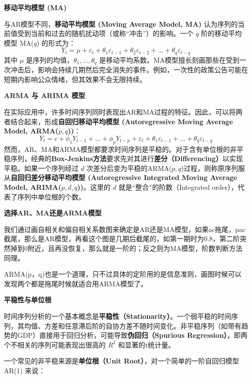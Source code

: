 \textbf{移动平均模型 (MA)}

与AR模型不同，\textbf{移动平均模型 (Moving Average Model, MA)} 认为序列的当前值受到当前和过去的随机扰动项（或称“冲击”）的影响。一个 $q$ 阶的移动平均模型 MA($q$) 的形式为：
\begin{equation}
	Y_t = \mu + \varepsilon_t + \theta_1 \varepsilon_{t-1} + \theta_2 \varepsilon_{t-2} + \dots + \theta_q \varepsilon_{t-q}
\end{equation}
其中 $\mu$ 是序列的均值，$\theta_1, \dots, \theta_q$ 是移动平均系数。MA模型擅长刻画那些在受到一次冲击后，影响会持续几期然后完全消失的事件。例如，一次性的政策公告可能在短期内影响公众情绪，但其效果不会无限持续。

\textbf{ARMA 与 ARIMA 模型}

在实际应用中，许多时间序列同时表现出AR和MA过程的特征。因此，可以将两者结合起来，形成\textbf{自回归移动平均模型 (Autoregressive Moving Average Model, ARMA($p,q$))}：
\begin{equation}
	Y_t = c + \phi_1 Y_{t-1} + \dots + \phi_p Y_{t-p} + \varepsilon_t + \theta_1 \varepsilon_{t-1} + \dots + \theta_q \varepsilon_{t-q}
\end{equation}
然而，AR、MA和ARMA模型都要求时间序列是平稳的。对于含有单位根的非平稳序列，经典的\textbf{Box-Jenkins方法}要求先对其进行\textbf{差分（Differencing）}以实现平稳。如果一个序列经过 $d$ 次差分后变为平稳的ARMA($p,q$)过程，则称原序列服从\textbf{自回归差分移动平均模型 (Autoregressive Integrated Moving Average Model, ARIMA($p,d,q$))}。这里的 $d$ 就是“整合”的阶数（Integrated order），代表了序列中单位根的个数。

\textbf{选择AR、MA还是ARMA模型}

我们通过画自相关和偏自相关系数图来确定是AR还是MA模型，如果ac拖尾，pac截尾，那么是AR模型，再看这个图是几期后截尾的，如第一期时为0.8，第二阶突然掉到0附近，且再没恢复，那么就是一阶的；反之则为MA模型，阶数判断方法同理。

ARMA(p，q)也是一个道理，只不过具体的定阶用的是信息准则，画图时候可以发现两个都是拖尾时候就适合用ARMA模型了。

\textbf{平稳性与单位根}

时间序列分析的一个基本概念是\textbf{平稳性（Stationarity）}。一个弱平稳的时间序列，其均值、方差和任意滞后阶的自协方差不随时间变化。非平稳序列（如带有趋势的GDP）直接用于回归分析，可能导致\textbf{伪回归（Spurious Regression）}，即两个不相关的序列可能表现出很高的 $R^2$ 和显著的t统计量。

一个常见的非平稳来源是\textbf{单位根（Unit Root）}，对一个简单的一阶自回归模型 AR(1) 来说：

